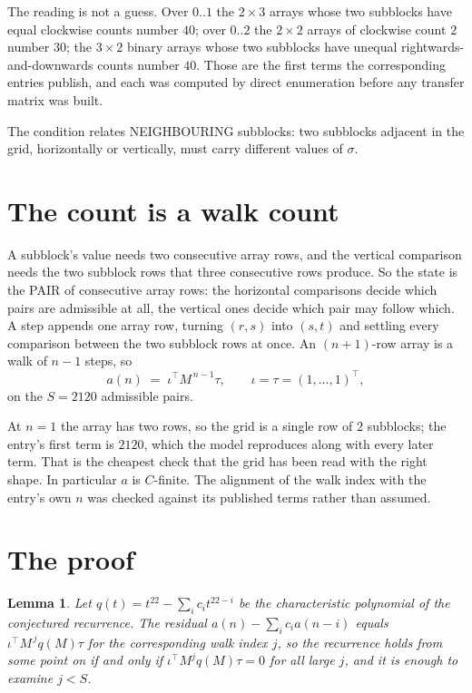 \documentclass[11pt,a4paper]{article}
\theoremstyle{plain}
\newtheorem{lemma}[theorem]{Lemma}
\theoremstyle{definition}
\begin{document}
The reading is not a guess. Over $0..1$ the $2\times3$ arrays whose two subblocks have equal
clockwise counts number $40$; over $0..2$ the $2\times2$ arrays of clockwise count $2$ number
$30$; the $3\times2$ binary arrays whose two subblocks have unequal rightwards-and-downwards
counts number $40$. Those are the first terms the corresponding entries publish, and each was
computed by direct enumeration before any transfer matrix was built.

The condition relates NEIGHBOURING subblocks: two subblocks adjacent in the grid, horizontally
or vertically, must carry different values of $\sigma$.

\section{The count is a walk count}

A subblock's value needs two consecutive array rows, and the vertical
comparison needs the two subblock rows that three consecutive rows produce. So the state is the
PAIR of consecutive array rows: the horizontal comparisons decide which pairs are admissible at
all, the vertical ones decide which pair may follow which. A step appends one array row,
turning $(r,s)$ into $(s,t)$ and settling every comparison between the two subblock rows at
once. An $(n+1)$-row array is a walk of $n-1$ steps, so
\[
a(n)\;=\;\iota^{\!\top}M^{\,n-1}\tau,\qquad\iota=\tau=(1,\dots,1)^{\!\top},
\]
on the $S=2120$ admissible pairs.

At $n=1$ the array has two rows, so the grid is a single row of $2$
subblocks; the entry's first term is $2120$, which the model
reproduces along with every later term. That is the cheapest check that the grid has been read
with the right shape.
In particular $a$ is $C$-finite. The alignment of the walk index with the entry's own $n$ was
checked against its published terms rather than assumed.

\section{The proof}

\begin{lemma}\label{lem:crit}
Let $q(t)=t^{22}-\sum_i c_it^{22-i}$ be the characteristic polynomial of the
conjectured recurrence. The residual $a(n)-\sum_ic_ia(n-i)$ equals
$\iota^{\!\top}M^{\,j}q(M)\tau$ for the corresponding walk index $j$, so the recurrence
holds from some point on if and only if $\iota^{\!\top}M^{j}q(M)\tau=0$ for all large $j$,
and it is enough to examine $j<S$.
\end{lemma}
\end{document}
